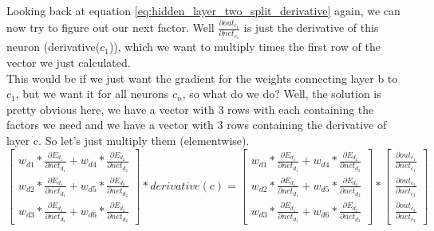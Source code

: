 \documentclass[11pt, halfparskip]{article}
\begin{document}
    \newpage \noindent
    Looking back at equation \ref{eq:hidden_layer_two_split_derivative} again, we can now try to figure out our next factor. Well $\frac{\partial out_{c_1}}{\partial net_{c_1}}$ is just
    the derivative of this neuron (derivative($c_1$)), which we want to multiply times the first row of the vector we just calculated.\\
    This would be if we just want the gradient for the weights connecting layer b to $c_1$, but we want it for all neurons $c_n$, so what do we do? Well, the solution is pretty obvious 
    here, we have a vector with 3 rows with each containing the factors we need and we have a vector with 3 rows containing the derivative of layer c. So let's just multiply them
    (elementwise).
    \[
    	\begin{bmatrix}
    		w_{d1} * \frac{\partial E_{d_1}}{\partial net_{d_1}} + w_{d4} * \frac{\partial E_{d_2}}{\partial net_{d_2}}\\
    		w_{d2 }* \frac{\partial E_{d_1}}{\partial net_{d_1}} + w_{d5} * \frac{\partial E_{d_2}}{\partial net_{d_2}}\\
    		w_{d3} * \frac{\partial E_{d_1}}{\partial net_{d_1}} + w_{d6} * \frac{\partial E_{d_2}}{\partial net_{d_2}}
    	\end{bmatrix}
    	* derivative(c) =
    	\begin{bmatrix}
    		w_{d1} * \frac{\partial E_{d_1}}{\partial net_{d_1}} + w_{d4} * \frac{\partial E_{d_2}}{\partial net_{d_2}}\\
    		w_{d2 }* \frac{\partial E_{d_1}}{\partial net_{d_1}} + w_{d5} * \frac{\partial E_{d_2}}{\partial net_{d_2}}\\
    		w_{d3} * \frac{\partial E_{d_1}}{\partial net_{d_1}} + w_{d6} * \frac{\partial E_{d_2}}{\partial net_{d_2}}
    	\end{bmatrix}
    	*
    	\begin{bmatrix}
    		\frac{\partial out_{c_1}}{\partial net_{c_1}}\\
    		\frac{\partial out_{c_2}}{\partial net_{c_2}}\\
    		\frac{\partial out_{c_3}}{\partial net_{c_3}}
    	\end{bmatrix}
    \]
\end{document}
